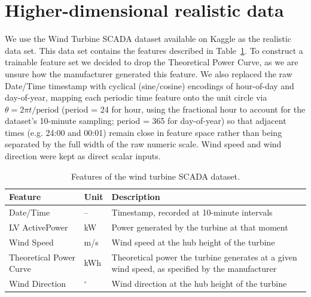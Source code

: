 \documentclass[10pt]{article}
\begin{document}
\begin{table}[tb]
  \centering
  \caption{Synthetic-data performance. NLL is not defined for the deterministic model.}
  \label{tab:synthetic-results}
  
\end{table}

\newpage
\section{Higher-dimensional realistic data}

We use the Wind Turbine SCADA dataset available on Kaggle as the realistic data set.
This data set contains the features described in Table~\ref{tab:scada_features}.
To construct a trainable feature set we decided to drop the Theoretical Power Curve, as we are unsure how the manufacturer generated this feature.
We also replaced the raw Date/Time timestamp with cyclical (sine/cosine) encodings of hour-of-day and day-of-year, mapping each periodic time feature onto the unit circle via $\theta = 2\pi t / \text{period}$ (period = 24 for hour, using the fractional hour to account for the dataset's 10-minute sampling; period = 365 for day-of-year) so that adjacent times (e.g. 24:00 and 00:01) remain close in feature space rather than being separated by the full width of the raw numeric scale.
Wind speed and wind direction were kept as direct scalar inputs.

\begin{table}[htbp]
    \centering
    \caption{Features of the wind turbine SCADA dataset.}
    \label{tab:scada_features}
    \begin{tabularx}{\linewidth}{@{} l l X @{}}
        \toprule
        \textbf{Feature} & \textbf{Unit} & \textbf{Description} \\
        \midrule
        Date/Time & -- & Timestamp, recorded at 10-minute intervals \\
        LV ActivePower & kW & Power generated by the turbine at that moment \\
        Wind Speed & m/s & Wind speed at the hub height of the turbine \\
        Theoretical Power Curve & kWh & Theoretical power the turbine generates at a given wind speed, as specified by the manufacturer \\
        Wind Direction & $^\circ$ & Wind direction at the hub height of the turbine \\
        \bottomrule
    \end{tabularx}
\end{table}
\end{document}
